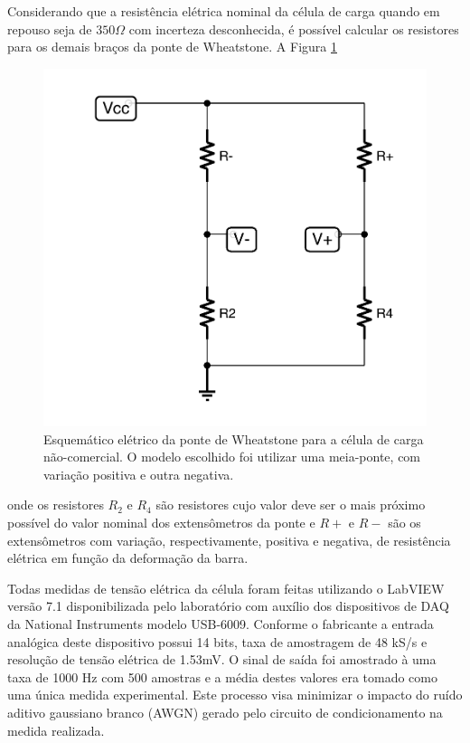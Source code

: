 \documentclass[a4paper]{instrumentacao}
\begin{document}
Considerando que a resistência elétrica nominal da célula de carga quando em repouso seja de $350 \Omega$ com incerteza desconhecida, é possível calcular os resistores para os demais braços da ponte de Wheatstone. A Figura \ref{fig:celula-nao-comercial-ponte}

\begin{figure}[H]
\center
\includegraphics[width=\textwidth]{WheatstoneNaoComercial.pdf}
\caption{Esquemático elétrico da ponte de Wheatstone para a célula de carga não-comercial. O modelo escolhido foi utilizar uma meia-ponte, com variação positiva e outra negativa.}
\label{fig:celula-nao-comercial-ponte}
\end{figure}

\noindent onde os resistores $R_2$ e $R_4$ são resistores cujo valor deve ser o mais próximo possível do valor nominal dos extensômetros da ponte e $R+$ e $R-$ são os extensômetros com variação, respectivamente, positiva e negativa, de resistência elétrica em função da deformação da barra.

Todas medidas de tensão elétrica da célula foram feitas utilizando o LabVIEW versão 7.1 disponibilizada pelo laboratório com auxílio dos dispositivos de DAQ da National Instruments modelo USB-6009. Conforme o fabricante \cite{daq-specifications} a entrada analógica deste dispositivo possui 14 bits, taxa de amostragem de 48 kS/s e resolução de tensão elétrica de 1.53mV. O sinal de saída foi amostrado à uma taxa de 1000 Hz com 500 amostras e a média destes valores era tomado como uma única medida experimental. Este processo visa minimizar o impacto do ruído aditivo gaussiano branco (AWGN) gerado pelo circuito de condicionamento na medida realizada.
\end{document}
